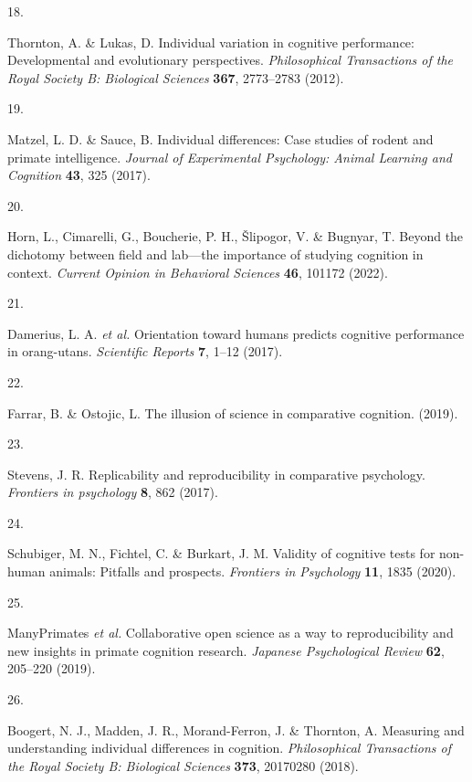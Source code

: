 \documentclass[
  man,floatsintext]{apa6}
\newlength{\cslhangindent}
\newlength{\csllabelwidth}
\newlength{\cslentryspacingunit} %
\newenvironment{CSLReferences}[2] %
 {%
  \setlength{\parindent}{0pt}
  \ifodd #1
  \let\oldpar\par
  \def\par{\hangindent=\cslhangindent\oldpar}
  \fi
  \setlength{\parskip}{#2\cslentryspacingunit}
 }%
 {}
\newcommand{\CSLLeftMargin}[1]{\parbox[t]{\csllabelwidth}{#1}}
\newcommand{\CSLRightInline}[1]{\parbox[t]{\linewidth - \csllabelwidth}{#1}\break}
\begin{document}
\begin{CSLReferences}{0}{0}
\leavevmode{}%
\CSLLeftMargin{18. }%
\CSLRightInline{Thornton, A. \& Lukas, D. Individual variation in cognitive performance: Developmental and evolutionary perspectives. \emph{Philosophical Transactions of the Royal Society B: Biological Sciences} \textbf{367}, 2773--2783 (2012).}

\leavevmode{}%
\CSLLeftMargin{19. }%
\CSLRightInline{Matzel, L. D. \& Sauce, B. Individual differences: Case studies of rodent and primate intelligence. \emph{Journal of Experimental Psychology: Animal Learning and Cognition} \textbf{43}, 325 (2017).}

\leavevmode{}%
\CSLLeftMargin{20. }%
\CSLRightInline{Horn, L., Cimarelli, G., Boucherie, P. H., Šlipogor, V. \& Bugnyar, T. Beyond the dichotomy between field and lab---the importance of studying cognition in context. \emph{Current Opinion in Behavioral Sciences} \textbf{46}, 101172 (2022).}

\leavevmode{}%
\CSLLeftMargin{21. }%
\CSLRightInline{Damerius, L. A. \emph{et al.} Orientation toward humans predicts cognitive performance in orang-utans. \emph{Scientific Reports} \textbf{7}, 1--12 (2017).}

\leavevmode{}%
\CSLLeftMargin{22. }%
\CSLRightInline{Farrar, B. \& Ostojic, L. The illusion of science in comparative cognition. (2019).}

\leavevmode{}%
\CSLLeftMargin{23. }%
\CSLRightInline{Stevens, J. R. Replicability and reproducibility in comparative psychology. \emph{Frontiers in psychology} \textbf{8}, 862 (2017).}

\leavevmode{}%
\CSLLeftMargin{24. }%
\CSLRightInline{Schubiger, M. N., Fichtel, C. \& Burkart, J. M. Validity of cognitive tests for non-human animals: Pitfalls and prospects. \emph{Frontiers in Psychology} \textbf{11}, 1835 (2020).}

\leavevmode{}%
\CSLLeftMargin{25. }%
\CSLRightInline{ManyPrimates \emph{et al.} Collaborative open science as a way to reproducibility and new insights in primate cognition research. \emph{Japanese Psychological Review} \textbf{62}, 205--220 (2019).}

\leavevmode{}%
\CSLLeftMargin{26. }%
\CSLRightInline{Boogert, N. J., Madden, J. R., Morand-Ferron, J. \& Thornton, A. Measuring and understanding individual differences in cognition. \emph{Philosophical Transactions of the Royal Society B: Biological Sciences} \textbf{373}, 20170280 (2018).}


\end{CSLReferences}
\end{document}
